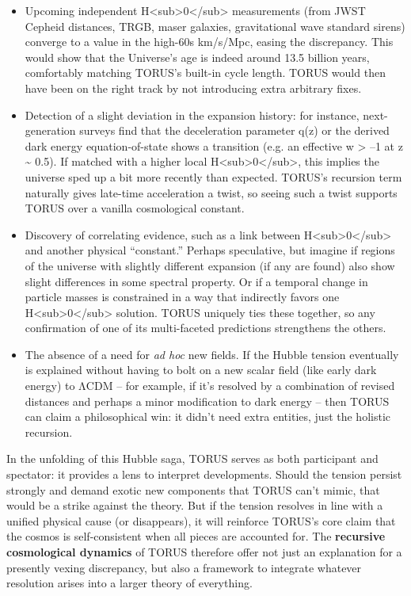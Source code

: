 \begin{itemize}
\item
  Upcoming independent
  H\textless{}sub\textgreater{}0\textless{}/sub\textgreater{}
  measurements (from JWST Cepheid distances, TRGB, maser galaxies,
  gravitational wave standard sirens) converge to a value in the
  high-60s km/s/Mpc, easing the discrepancy. This would show that the
  Universe's age is indeed around 13.5 billion years, comfortably
  matching TORUS's built-in cycle length. TORUS would then have been on
  the right track by not introducing extra arbitrary fixes.
\item
  Detection of a slight deviation in the expansion history: for
  instance, next-generation surveys find that the deceleration parameter
  q(z) or the derived dark energy equation-of-state shows a transition
  (e.g. an effective w \textgreater{} --1 at z \textasciitilde{} 0.5).
  If matched with a higher local
  H\textless{}sub\textgreater{}0\textless{}/sub\textgreater{}, this
  implies the universe sped up a bit more recently than expected.
  TORUS's recursion term naturally gives late-time acceleration a twist,
  so seeing such a twist supports TORUS over a vanilla cosmological
  constant.
\item
  Discovery of correlating evidence, such as a link between
  H\textless{}sub\textgreater{}0\textless{}/sub\textgreater{} and
  another physical ``constant.'' Perhaps speculative, but imagine if
  regions of the universe with slightly different expansion (if any are
  found) also show slight differences in some spectral property. Or if a
  temporal change in particle masses is constrained in a way that
  indirectly favors one
  H\textless{}sub\textgreater{}0\textless{}/sub\textgreater{} solution.
  TORUS uniquely ties these together, so any confirmation of one of its
  multi-faceted predictions strengthens the others.
\item
  The absence of a need for \emph{ad hoc} new fields. If the Hubble
  tension eventually is explained without having to bolt on a new scalar
  field (like early dark energy) to ΛCDM -- for example, if it's
  resolved by a combination of revised distances and perhaps a minor
  modification to dark energy -- then TORUS can claim a philosophical
  win: it didn't need extra entities, just the holistic recursion.
\end{itemize}

In the unfolding of this Hubble saga, TORUS serves as both participant
and spectator: it provides a lens to interpret developments. Should the
tension persist strongly and demand exotic new components that TORUS
can't mimic, that would be a strike against the theory. But if the
tension resolves in line with a unified physical cause (or disappears),
it will reinforce TORUS's core claim that the cosmos is self-consistent
when all pieces are accounted for. The \textbf{recursive cosmological
dynamics} of TORUS therefore offer not just an explanation for a
presently vexing discrepancy, but also a framework to integrate whatever
resolution arises into a larger theory of everything.

